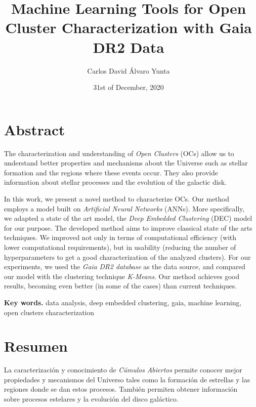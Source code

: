 \documentclass[11pt, a4paper, english]{book}
\title{Machine Learning Tools for Open Cluster Characterization with Gaia DR2 Data}
\author{Carlos David Álvaro Yunta}
\date{31st of December, 2020}
\begin{document}

\maketitle

\frontmatter
\tableofcontents

\listoffigures
\listoftables

\chapter{Abstract}

The characterization and understanding of \emph{Open Clusters} (OCs) allow us to
understand better properties and mechanisms about the Universe such as stellar
formation and the regions where these events occur. They also provide information
about stellar processes and the evolution of the galactic disk.

In this work, we present a novel method to characterize OCs. Our method employs a
model built on \emph{Artificial Neural Networks} (ANNs). More specifically, we adapted
a state of the art model, the \emph{Deep Embedded Clustering} (DEC) model for our purpose.
The developed method aims to improve classical state of the arts techniques. We improved
not only in terms of computational efficiency (with lower computational requirements),
but in usability (reducing the number of hyperparameters to get a good characterization
of the analyzed clusters). For our experiments, we used the \emph{Gaia DR2 database} as
the data source, and compared our model with the clustering technique \emph{K-Means}. Our
method achieves good results, becoming even better (in some of the cases) than current techniques.

\medskip

{\bf Key words.} data analysis, deep embedded clustering, gaia, machine learning, open clusters characterization

\chapter{Resumen}

La caracterización y conocimiento de \emph{Cúmulos Abiertos} permite conocer mejor
propiedades y mecanismos del Universo tales como la formación de estrellas y las
regiones donde se dan estos procesos. También permiten obtener información sobre
procesos estelares y la evolución del disco galáctico.
\end{document}
